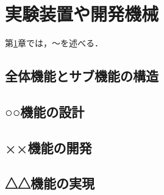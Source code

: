 ﻿%

\chapter{実験装置や開発機械}\label{chapter:実験装置や開発機械}
第\ref{chapter:実験装置や開発機械}章では，～を述べる．

\section{全体機能とサブ機能の構造}
\section{○○機能の設計}
\section{××機能の開発}
\section{△△機能の実現}



